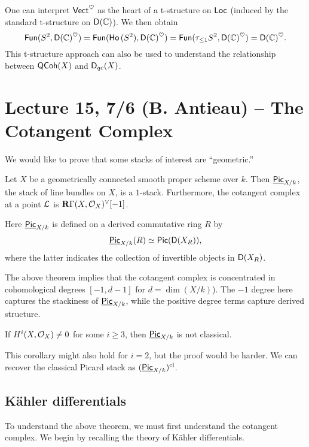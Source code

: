 \documentclass{amsart}
\begin{document}
One can interpret $\mathsf{Vect}^\heartsuit$ as the heart of a t-structure on $\mathsf{Loc}$ (induced by the standard t-structure on $\mathsf{D}(\mathbb{C})$).
We then obtain 
\[
	\mathsf{Fun}(S^2, \mathsf{D}(\mathbb{C})^\heartsuit) = \mathsf{Fun}(\mathsf{Ho}\,(S^2), \mathsf{D}(\mathbb{C})^\heartsuit) = \mathsf{Fun}(\tau_{\leq 1} S^2, \mathsf{D}(\mathbb{C})^\heartsuit) = \mathsf{D}(\mathbb{C})^\heartsuit.
\]
This t-structure approach can also be used to understand the relationship between $\mathsf{QCoh}(X)$ and $\mathsf{D}_{qc}(X)$.

\section{Lecture 15, 7/6 (B. Antieau) -- The Cotangent Complex}

We would like to prove that some stacks of interest are ``geometric.''

\begin{thm}
	Let $X$ be a geometrically connected smooth proper scheme over $k$.
	Then $\underline{\mathsf{Pic}}_{X/k}$, the stack of line bundles on $X$, is a $1$-stack.
	Furthermore, the cotangent complex at a point $\mathcal{L}$ is $\mathbf{R} \Gamma(X, \mathcal{O}_X)^\vee[-1]$.
\end{thm}

Here $\underline{\mathsf{Pic}}_{X/k}$ is defined on a derived commutative ring $R$ by
\[
	\underline{\mathsf{Pic}}_{X/k}(R) \simeq \mathsf{Pic}(\mathsf{D}(X_R)),
\]
where the latter indicates the collection of invertible objects in $\mathsf{D}(X_R)$.

The above theorem implies that the cotangent complex is concentrated in cohomological degrees $[-1, d-1]$ for $d = \dim (X / k)$).
The $-1$ degree here captures the stackiness of $\underline{\mathsf{Pic}}_{X/k}$, while the positive degree terms capture derived structure.

\begin{cor}
	If $H^i(X, \mathcal{O}_X) \neq 0$ for some $i \geq 3$, then $\underline{\mathsf{Pic}}_{X/k}$ is not classical.
\end{cor}

This corollary might also hold for $i = 2$, but the proof would be harder.
We can recover the classical Picard stack as $(\underline{\mathsf{Pic}}_{X/k})^{\mathrm{cl}}$.

\subsection{K\"ahler differentials}

To understand the above theorem, we must first understand the cotangent complex.
We begin by recalling the theory of K\"ahler differentials.
\end{document}
